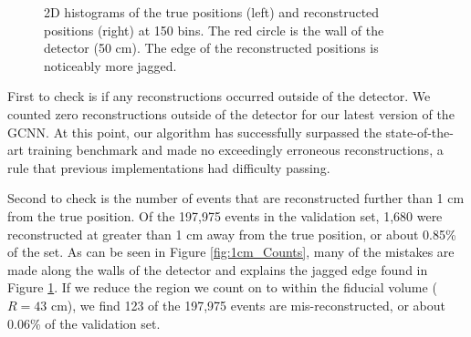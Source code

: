 \documentclass[../thesis.tex]{subfiles}
\begin{document}
\begin{figure}[t]
\begin{subfigure}[b]{0.45\textwidth}
	\end{subfigure}
	\caption{
	2D histograms of the true positions (left) and reconstructed positions (right) at 150 bins.
	The red circle is the wall of the detector (50 cm).
	The edge of the reconstructed positions is noticeably more jagged.
	}
	\label{fig:2D_Hists}
\end{figure}

\par First to check is if any reconstructions occurred outside of the detector.
We counted zero reconstructions outside of the detector for our latest version of the GCNN.
At this point, our algorithm has successfully surpassed the state-of-the-art training benchmark and made no exceedingly erroneous reconstructions, a rule that previous implementations had difficulty passing.

\par Second to check is the number of events that are reconstructed further than 1 cm from the true position.
Of the 197,975 events in the validation set, 1,680 were reconstructed at greater than 1 cm away from the true position, or about 0.85\% of the set.
As can be seen in Figure \ref{fig:1cm_Counts}, many of the mistakes are made along the walls of the detector and explains the jagged edge found in Figure \ref{fig:2D_Hists}.
If we reduce the region we count on to within the fiducial volume ($R=43$ cm), we find 123 of the 197,975 events are mis-reconstructed, or about 0.06\% of the validation set.
\end{document}
